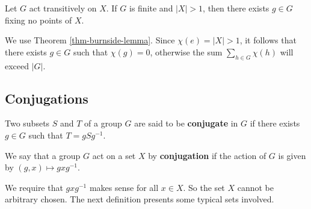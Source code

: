 \begin{remark}
\begin{proposition}
	Let $G$ act transitively on $X$. If $G$ is finite and $|X|>1$, then there exists $g\in G$ fixing no points of $X$.
\end{proposition}
\begin{sketch}
	We use Theorem \ref{thm-burnside-lemma}. Since $\chi(e) = |X|>1$, it follows that there exists $g\in G$ such that $\chi(g) = 0$, otherwise the sum $\sum_{h\in G}\chi(h)$ will exceed $|G|$.
\end{sketch}



\subsection{Conjugations}
\begin{definition}
	Two subsets $S$ and $T$ of a group $G$ are said to be \textbf{conjugate} in $G$ if there exists $g \in G$ such that $T =
	gSg^{-1}$.
\end{definition}
\begin{definition}
	We say that a group $G$ act on a set $X$ by \textbf{conjugation} if the action of $G$ is given by $(g,x)\mapsto gxg^{-1}$.
\end{definition}
\begin{remark}
	We require that $gxg^{-1}$ makes sense for all $x\in X$. So the set $X$ cannot be arbitrary chosen. The next definition presents some typical sets involved.
\end{remark}


\end{remark}
